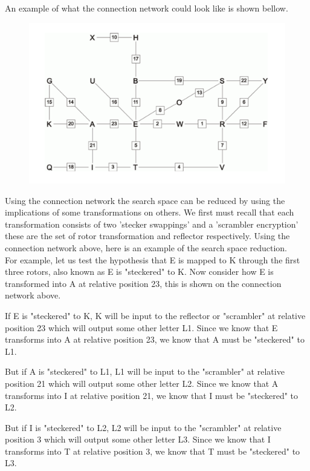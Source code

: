 \documentclass[12pt,a4paper]{article}
\begin{document}
An example of what the connection network could look like is shown bellow.

\begin{figure}[h]
\centering
\includegraphics[width=\textwidth]{StageTwoBOMBE.png}
\end{figure}

Using the connection network the search space can be reduced by using the implications of some transformations on others. We first must recall that each transformation consists of two 'stecker swappings' and a 'scrambler encryption' these are the set of rotor transformation and reflector respectively. Using the connection network above, here is an example of the search space reduction.\\

For example, let us test the hypothesis that E is mapped to K through the first three rotors, also known as E is "steckered" to K. Now consider how E is transformed into A at relative position 23, this is shown on the connection network above.

If E is "steckered" to K, K will be input to the reflector or "scrambler" at relative position 23 which will output some other letter L1. Since we know that E transforms into A at relative position 23, we know that A must be "steckered" to L1.

But if A is "steckered" to L1, L1 will be input to the "scrambler" at relative position 21 which will output some other letter L2. Since we know that A transforms into I at relative position 21, we know that I must be "steckered" to L2.

But if I is "steckered" to L2, L2 will be input to the "scrambler" at relative position 3 which will output some other letter L3. Since we know that I transforms into T at relative position 3, we know that T must be "steckered" to L3.
\end{document}
